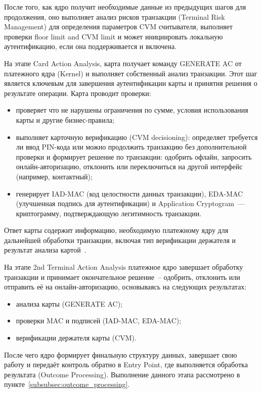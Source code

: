 После того, как ядро получит необходимые данные из предыдущих шагов для продолжения, оно выполняет анализ рисков транзакции (Terminal Risk Management) для определения параметров CVM считывателя, выполняет проверки floor limit and CVM limit и может инициировать локальную аутентификацию, если она поддерживается и включена.

На этапе Card Action Analysis, карта получает команду GENERATE AC от платежного ядра (Kernel) и выполняет собственный анализ транзакции.
Этот шаг является ключевым для завершения аутентификации карты и принятия решения о результате операции.
Карта проводит проверки:

\begin{itemize}
    \item проверяет что не нарушены ограничения по сумме, условия использования карты и другие бизнес-правила;
    \item выполняет карточную верификацию (CVM decisioning): определяет требуется ли ввод PIN-кода или можно продолжить транзакцию без дополнительной проверки и формирует решение по транзакции: одобрить офлайн, запросить онлайн-авторизацию, отклонить или переключиться на другой интерфейс (например, контактный);
    \item генерирует IAD-MAC (код целостности данных транзакции), EDA-MAC (улучшенная подпись для аутентификации) и Application Cryptogram~--- криптограмму, подтверждающую легитимность транзакции.
\end{itemize}

Ответ карты содержит информацию, необходимую платежному ядру для дальнейшей обработки транзакции, включая тип верификации держателя и результат анализа картой~\cite{emv_book_c8}.

На этапе 2nd Terminal Action Analysis платежное ядро завершает обработку транзакции и принимает окончательное решение~-- одобрить, отклонить или отправить её на онлайн-авторизацию, основываясь на следующих результатах:
\begin{itemize}
    \item анализа карты (GENERATE AC);
    \item проверки MAC и подписей (IAD-MAC, EDA-MAC);
    \item верификации держателя карты (CVM).
\end{itemize}

После чего ядро формирует финальную структуру данных, завершает свою работу и передаёт контроль обратно в Entry Point, где выполняется обработка результата (Outcome Processing).
Выполнение данного этапа рассмотрено в пункте~\ref{subsubsec:outcome_processing}.


